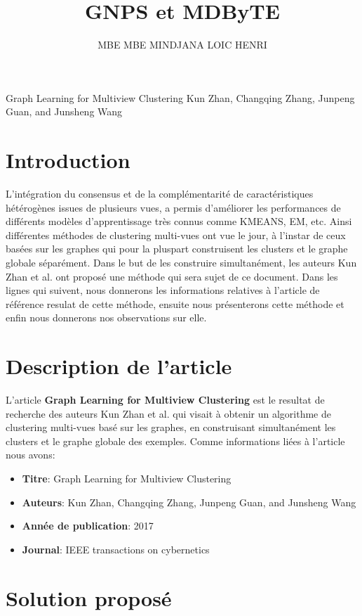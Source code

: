\documentclass[12pt, french, latin.medieval, a4paper]{report}
\author{MBE MBE MINDJANA LOIC HENRI}
\title{GNPS et MDByTE}
\begin{document}
    
    \pagecouverture
    {Graph Learning for Multiview Clustering}
    {Kun Zhan, Changqing Zhang, Junpeng Guan, and Junsheng Wang}
    \tableofcontents
    \vspace{20cm}
    
    \section{Introduction}
    L'intégration du consensus et de la complémentarité de caractéristiques hétérogènes issues de plusieurs vues, a permis d'améliorer les performances de différents modèles d'apprentissage très connus comme KMEANS, EM, etc.
    Ainsi différentes méthodes de clustering multi-vues ont vue le jour, à l'instar de ceux basées sur les graphes qui pour la pluspart construisent les clusters et le graphe globale séparément. 
    Dans le but de les construire simultanément, les auteurs Kun Zhan et al. ont proposé une méthode qui sera sujet de ce document. 
    Dans les lignes qui suivent, nous donnerons les informations relatives à l'article de référence \cite{zhan2017graph} resulat de cette méthode, ensuite nous présenterons cette méthode et enfin nous donnerons nos observations sur elle.

	\section{Description de l'article}
     	L'article \textbf{Graph Learning for Multiview Clustering} \cite{zhan2017graph} est le resultat de recherche des auteurs Kun Zhan et al. qui visait à obtenir un algorithme de clustering multi-vues basé sur les graphes, en construisant simultanément les clusters et le graphe globale des exemples.
        Comme informations liées à l'article nous avons: 
    	\begin{itemize}
        	\item \textbf{Titre}: Graph Learning for Multiview Clustering
        	\item \textbf{Auteurs}: Kun Zhan, Changqing Zhang, Junpeng Guan, and Junsheng Wang
        	\item \textbf{Année de publication}: 2017
        	\item \textbf{Journal}: IEEE transactions on cybernetics
    	\end{itemize}

	\section{Solution proposé}
	
\end{document}
